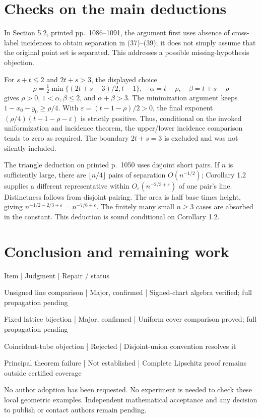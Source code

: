 \documentclass[10pt]{article}
\begin{document}
\section*{Checks on the main deductions}
In Section 5.2, printed pp. 1086–1091, the argument first uses absence of cross-label incidences to obtain separation in (37)–(39); it does not simply assume that the original point set is separated. This addresses a possible missing-hypothesis objection.\par
For \(s+t\leq2\) and \(2t+s>3\), the displayed choice \[\rho=\tfrac12\min\{(2t+s-3)/2,t-1\},\quad
\alpha=t-\rho,\quad\beta=t+s-\rho\] gives \(\rho>0\), \(1<\alpha,\beta\leq2\), and \(\alpha+\beta>3\). The minimization argument keeps \(1-x_0-y_0\geq\rho/4\). With \(\varepsilon=(t-1-\rho)/2>0\), the final exponent \((\rho/4)(t-1-\rho-\varepsilon)\) is strictly positive. Thus, conditional on the invoked uniformization and incidence theorem, the upper/lower incidence comparison tends to zero as required. The boundary \(2t+s=3\) is excluded and was not silently included.\par
The triangle deduction on printed p. 1050 uses disjoint short pairs. If \(n\) is sufficiently large, there are \(\lfloor n/4\rfloor\) pairs of separation \(O(n^{-1/2})\); Corollary 1.2 supplies a different representative within \(O_\varepsilon(n^{-2/3+\varepsilon})\) of one pair’s line. Distinctness follows from disjoint pairing. The area is half base times height, giving \(n^{-1/2-2/3+\varepsilon}=n^{-7/6+\varepsilon}\). The finitely many small \(n\geq3\) cases are absorbed in the constant. This deduction is sound conditional on Corollary 1.2.\par
\section*{Conclusion and remaining work}
Item | Judgment | Repair / status\par
Unsigned line comparison | Major, confirmed | Signed-chart algebra verified; full propagation pending\par
Fixed lattice bijection | Major, confirmed | Uniform cover comparison proved; full propagation pending\par
Coincident-tube objection | Rejected | Disjoint-union convention resolves it\par
Principal theorem failure | Not established | Complete Lipschitz proof remains outside certified coverage\par
No author adoption has been requested. No experiment is needed to check these local geometric examples. Independent mathematical acceptance and any decision to publish or contact authors remain pending.\par
\end{document}
